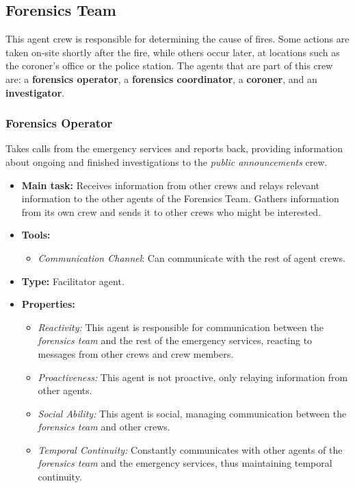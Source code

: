 \subsection{Forensics Team}
This agent crew is responsible for determining the cause of fires. Some actions are taken on-site shortly after the fire, while others occur later, at locations such as the coroner's office or the police station. The agents that are part of this crew are: a \textbf{forensics operator}, a \textbf{forensics coordinator}, a \textbf{coroner}, and an \textbf{investigator}.

\subsubsection{Forensics Operator}
Takes calls from the emergency services and reports back, providing information about ongoing and finished investigations to the \textit{public announcements} crew.
\begin{itemize}
    \item \textbf{Main task:} Receives information from other crews and relays relevant information to the other agents of the Forensics Team. Gathers information from its own crew and sends it to other crews who might be interested.
    \item \textbf{Tools:}
    \begin{itemize}
        \item \textit{Communication Channel}: Can communicate with the rest of agent crews.
    \end{itemize}
    \item \textbf{Type:} Facilitator agent.
    \item \textbf{Properties:}
    \begin{itemize}
        \item \textit{Reactivity:} This agent is responsible for communication between the \textit{forensics team} and the rest of the emergency services, reacting to messages from other crews and crew members.
        \item \textit{Proactiveness:} This agent is not proactive, only relaying information from other agents.
        \item \textit{Social Ability:} This agent is social, managing communication between the \textit{forensics team} and other crews.
        \item \textit{Temporal Continuity:} Constantly communicates with other agents of the \textit{forensics team} and the emergency services, thus maintaining temporal continuity.
    \end{itemize}
\end{itemize}

